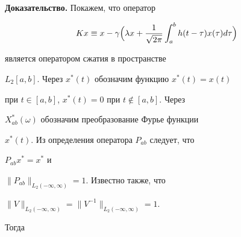 {\bf Доказательство.} Покажем, что оператор


$$


Kx\equiv x-\gamma\Bigl(\lambda x+\frac{1}{\sqrt{2\pi}}


\int_a^b h(t-\tau) x(\tau) d\tau\Bigr)


$$


является оператором сжатия в пространстве


$L_2[a,b]$. Через $x^*(t)$ обозначим функцию $x^*(t) = x(t)$


при $t\in [a,b]$, $x^*(t)=0$ при $t\notin [a,b]$. Через


$X^*_{ab}(\omega)$ обозначим преобразование Фурье функции


$x^*(t)$. Из определения оператора $P_{ab}$ следует, что


$P_{ab} x^*=x^*$ и


$\|P_{ab}\|_{L_2(-\infty,\infty)}=1$. Известно также, что


$\|V\|_{L_2(-\infty,\infty)}=\|V^{-1}\|_{L_2(-\infty,\infty)}=1$.


Тогда


